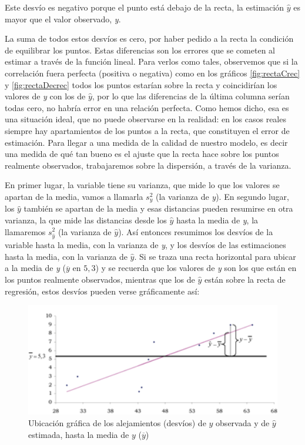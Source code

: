 \documentclass[]{book}
\begin{document}
Este desvío es negativo porque el punto está debajo de la recta, la
estimación \(\widehat{y}\) es mayor que el valor observado, \emph{y}.

La suma de todos estos desvíos es cero, por haber pedido a la recta la
condición de equilibrar los puntos. Estas diferencias son los errores
que se cometen al estimar a través de la función lineal. Para verlos
como tales, observemos que si la correlación fuera perfecta (positiva o
negativa) como en los gráficos \ref{fig:rectaCrec} y \ref{fig:rectaDecrec} todos los puntos estarían sobre la
recta y coincidirían los valores de \emph{y} con los de \(\widehat{y}\), por lo
que las diferencias de la última columna serían todas cero, no habría
error en una relación perfecta. Como hemos dicho, esa es una situación
ideal, que no puede observarse en la realidad: en los casos reales
siempre hay apartamientos de los puntos a la recta, que constituyen el
error de estimación. Para llegar a una medida de la calidad de nuestro
modelo, es decir una medida de qué tan bueno es el ajuste que la recta
hace sobre los puntos realmente observados, trabajaremos sobre la
dispersión, a través de la varianza.

En primer lugar, la variable tiene su varianza, que mide lo que los
valores se apartan de la media, vamos a llamarla \(s_{y}^{2}\) (la
varianza de \emph{y}). En segundo lugar, los \(\widehat{y}\) también se apartan
de la media y esas distancias pueden resumirse en otra varianza, la que
mide las distancias desde los \(\widehat{y}\) hasta la media de \emph{y}, la
llamaremos \(s_{\widehat{y}}^{2}\) (la varianza de \(\widehat{y}\)). Así
entonces resumimos los desvíos de la variable hasta la media, con la
varianza de \emph{y}, y los desvíos de las estimaciones hasta la media, con
la varianza de \(\widehat{y}\). Si se traza una recta horizontal para
ubicar a la media de \emph{y} (\(\overline{y}\) en \(5,3\)) y se recuerda que los
valores de \emph{y} son los que están en los puntos realmente observados,
mientras que los de \(\widehat{y}\) están sobre la recta de regresión,
estos desvíos pueden verse gráficamente así:

\begin{figure}

{\centering \includegraphics[width=4.78in]{imagenes/grafico14} 

}

\caption{Ubicación gráfica de los alejamientos (desvíos) de $y$ observada y de $\widehat{y}$ estimada, hasta la media de $y$ ($\overline{y}$)}\label{fig:unnamed-chunk-183}
\end{figure}
\end{document}
